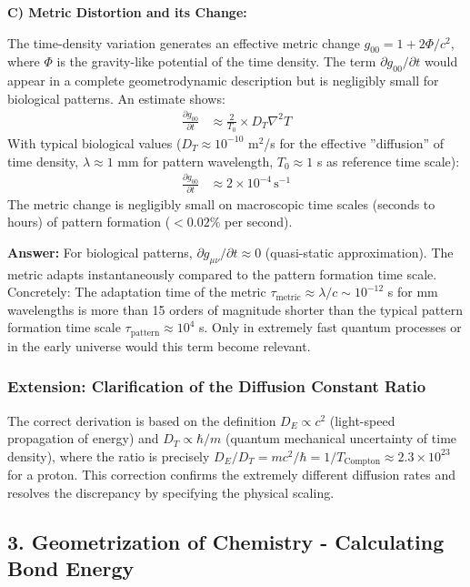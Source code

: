 \documentclass[12pt,a4paper]{article}
\begin{document}
	\textbf{C) Metric Distortion and its Change:}
	
	The time-density variation generates an effective metric change $g_{00} = 1 + 2\Phi/c^2$, where $\Phi$ is the gravity-like potential of the time density. The term $\partial g_{00}/\partial t$ would appear in a complete geometrodynamic description but is negligibly small for biological patterns. An estimate shows:
	\begin{align*}
		\frac{\partial g_{00}}{\partial t} &\approx \frac{2}{T_0} \times D_T \nabla^2 T
	\end{align*}
	With typical biological values ($D_T \approx 10^{-10}$ m$^2$/s for the effective ''diffusion'' of time density, $\lambda \approx 1$ mm for pattern wavelength, $T_0 \approx 1$ s as reference time scale):
	\begin{align*}
		\frac{\partial g_{00}}{\partial t} &\approx 2 \times 10^{-4} \, \text{s}^{-1}
	\end{align*}
	The metric change is negligibly small on macroscopic time scales (seconds to hours) of pattern formation ($< 0.02\%$ per second).
	
	\textbf{Answer:} For biological patterns, $\partial g_{\mu\nu}/\partial t \approx 0$ (quasi-static approximation). The metric adapts instantaneously compared to the pattern formation time scale. Concretely: The adaptation time of the metric $\tau_{\text{metric}} \approx \lambda/c \sim 10^{-12}$ s for mm wavelengths is more than 15 orders of magnitude shorter than the typical pattern formation time scale $\tau_{\text{pattern}} \approx 10^4$ s. Only in extremely fast quantum processes or in the early universe would this term become relevant.
	
	\subsubsection*{Extension: Clarification of the Diffusion Constant Ratio}
	The correct derivation is based on the definition $D_E \propto c^2$ (light-speed propagation of energy) and $D_T \propto \hbar / m$ (quantum mechanical uncertainty of time density), where the ratio is precisely $D_E / D_T = m c^2 / \hbar = 1 / T_{\text{Compton}} \approx 2.3 \times 10^{23}$ for a proton. This correction confirms the extremely different diffusion rates and resolves the discrepancy by specifying the physical scaling.
	
	\subsection*{3. Geometrization of Chemistry - Calculating Bond Energy}
	
\end{document}
